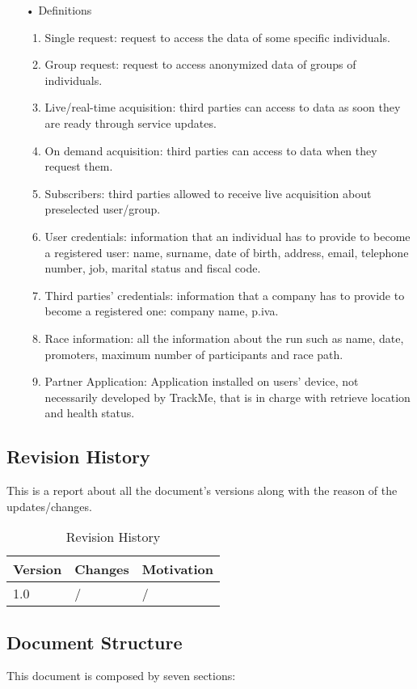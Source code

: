 \begin{enumerate}
\item[•] {\Large Definitions}
	\begin{enumerate}
		\item Single request: request to access the data of some specific  individuals.
		\item Group request: request to access anonymized data of groups of individuals.
		\item Live/real-time acquisition: third parties can access to data as soon they are ready through service updates.
		\item On demand acquisition: third parties can access to data when they request them.
		\item Subscribers: third parties allowed to receive live acquisition about preselected user/group.
		\item User credentials: information that an individual has to provide to become a registered user: name, surname, date of birth, address, email, telephone number, job, marital status and fiscal code. 
		\item Third parties' credentials: information that a company has to provide to become a registered one: company name, p.iva.
		\item Race information: all the information about the run such as name, date, promoters, maximum number of participants and race path.
		\item Partner Application: Application installed on users' device, not necessarily developed by TrackMe, that is in charge with retrieve location and health status. 
	\end{enumerate}
\end{enumerate}
\subsection{Revision History}
This is a report about all the document's versions along with the reason of the updates/changes.

\begin{table}[h]
\centering
\begin{tabular}{|l|p{}|p{}|}
\hline
Version & Changes & Motivation\\ \hline
1.0     & / & / \\ \hline
\end{tabular}
\caption{Revision History}
\end{table}

\clearpage
\subsection{Document Structure}
This document is composed by seven sections:

